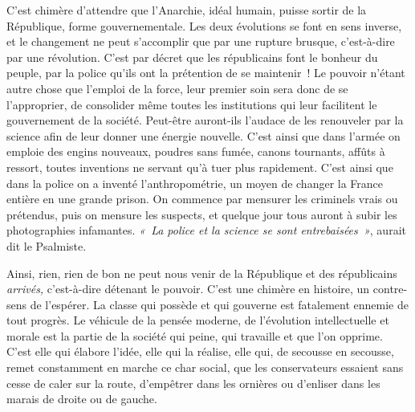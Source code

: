 \documentclass[french,twoside]{book} %
\begin{document}
C’est chimère d’attendre que l’Anarchie, idéal humain, puisse sortir de la République, forme gouvernementale. Les deux évolutions se font en sens inverse, et le changement ne peut s’accomplir que par une rupture brusque, c’est-à-dire par une révolution. C’est  par décret que les républicains font le bonheur du peuple, par la police qu’ils ont la prétention de se maintenir ! Le pouvoir n’étant autre chose que l’emploi de la force, leur premier soin sera donc de se l’approprier, de consolider même toutes les institutions qui leur facilitent le gouvernement de la société. Peut-être auront-ils l’audace de les renouveler par la science afin de leur donner une énergie nouvelle. C’est ainsi que dans l’armée on emploie des engins nouveaux, poudres sans fumée, canons tournants, affûts à ressort, toutes inventions ne servant qu’à tuer plus rapidement. C’est ainsi que dans la police on a inventé l’anthropométrie, un moyen de changer la France entière en une grande prison. On commence par mensurer les criminels  vrais ou prétendus, puis on mensure les suspects, et quelque jour tous auront à subir les photographies infamantes. \emph{« La police et la science se sont entrebaisées »}, aurait dit le Psalmiste.\par
Ainsi, rien, rien de bon ne peut nous venir de la République et des républicains \emph{arrivés,} c’est-à-dire détenant le pouvoir. C’est une chimère en histoire, un contre-sens de l’espérer. La classe qui possède et qui gouverne est fatalement ennemie de tout progrès. Le véhicule de la pensée moderne, de l’évolution intellectuelle et morale est la partie de la société qui peine, qui travaille et que l’on opprime. C’est elle qui élabore l’idée, elle qui la réalise, elle qui, de secousse en secousse, remet  constamment en marche ce char social, que les conservateurs essaient sans cesse de caler sur la route, d’empêtrer dans les ornières ou d’enliser dans les marais de droite ou de gauche.\par
\end{document}
